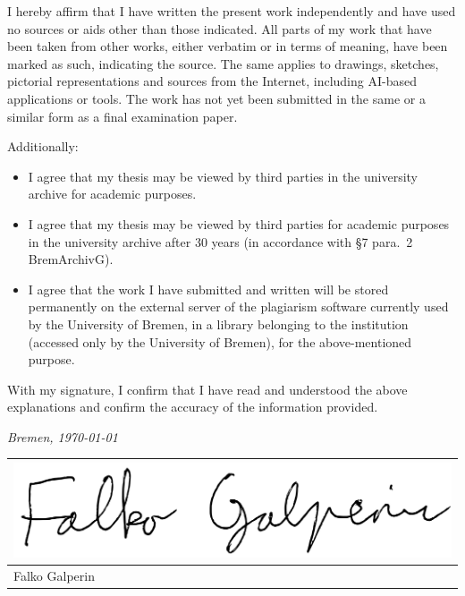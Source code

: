 \documentclass[%
	paper=A4,
	twoside=true,
	openright,
	parskip=half,           %
  11pt,
	chapterprefix=true,     %
	headings=normal,        %
	bibliography=totocnumbered,     %
	titlepage=on,           %
	captions=tableabove,    %
]{scrbook}
\newcommand{\myName}{Falko Galperin\xspace}
\begin{document}
I hereby affirm that I have written the present work independently and have used no sources or aids other than
those indicated. All parts of my work that have been taken from other works, either verbatim or in terms of
meaning, have been marked as such, indicating the source. The same applies to drawings, sketches, pictorial
representations and sources from the Internet, including AI-based applications or tools. The work has not yet
been submitted in the same or a similar form as a final examination paper.

Additionally:
\begin{itemize}
	\item I agree that my thesis may be viewed by third parties in the university archive for academic purposes.
	\item I agree that my thesis may be viewed by third parties for academic purposes in the university archive after 30 years (in accordance with \S{}7 para.\ 2 BremArchivG).
	\item I agree that the work I have submitted and written will be stored permanently on the external server
	      of the plagiarism software currently used by the University of Bremen, in a library belonging to the
	      institution (accessed only by the University of Bremen), for the above-mentioned purpose.
\end{itemize}

With my signature, I confirm that I have read and understood the above explanations and confirm the
accuracy of the information provided.

\bigskip

\noindent\textit{Bremen, \today}
\smallskip

\begin{flushright}
	\begin{tabular}{m{5cm}}
		\includegraphics[height=2\baselineskip]{signature}
		\vspace{-1cm}
		\\ \hline
		\centering\myName \\
	\end{tabular}
\end{flushright}
\vfill
\end{document}
